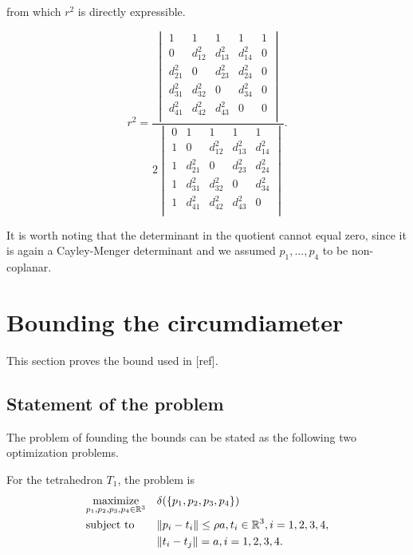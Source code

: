 from which $r^2$ is directly expressible.

\begin{equation}\label{eq:Cayley-Menger-expanded}
r^2 
=
\frac{
\begin{vmatrix}
1 & 1 & 1 & 1 & 1 \\
0 & d^2_{12} & d^2_{13} & d^2_{14} & 0 \\
d^2_{21} & 0 & d^2_{23} & d^2_{24} & 0 \\
d^2_{31} & d^2_{32} & 0 & d^2_{34} & 0 \\ 
d^2_{41} & d^2_{42} & d^2_{43} & 0 & 0 \\
\end{vmatrix}}
{2 \begin{vmatrix}
0 & 1 & 1 & 1 & 1 \\
1 & 0 & d^2_{12} & d^2_{13} & d^2_{14} \\
1 & d^2_{21} & 0 & d^2_{23} & d^2_{24} \\
1 & d^2_{31} & d^2_{32} & 0 & d^2_{34} \\ 
1 & d^2_{41} & d^2_{42} & d^2_{43} & 0 \\
\end{vmatrix} 
}.
\end{equation}

It is worth noting that the determinant in the quotient cannot equal zero, since it is again a Cayley-Menger determinant and we assumed $p_1,\dots,p_4$ to be non-coplanar. 



\section{Bounding the circumdiameter}
This section proves the bound used in [ref].

\subsection{Statement of the problem}

The problem of founding the bounds can be stated as the following two optimization problems. \newline

\noindent For the tetrahedron $T_1$, the problem is 
\begin{equation}\label{prob:tetra1}
\begin{aligned}
& \underset{p_1,p_2,p_3,p_4\in {\mathbb R^3}}{\text{maximize}}
& & \delta(\{p_1,p_2,p_3,p_4\}) \\
& \text{subject to}
& & \| p_i - t_i\| \leq \rho a, t_i\in {\mathbb R^3}, i=1,2,3,4, \\
& & &\|t_i - t_j\| = a, i=1,2,3,4. 
\end{aligned}
\end{equation}

